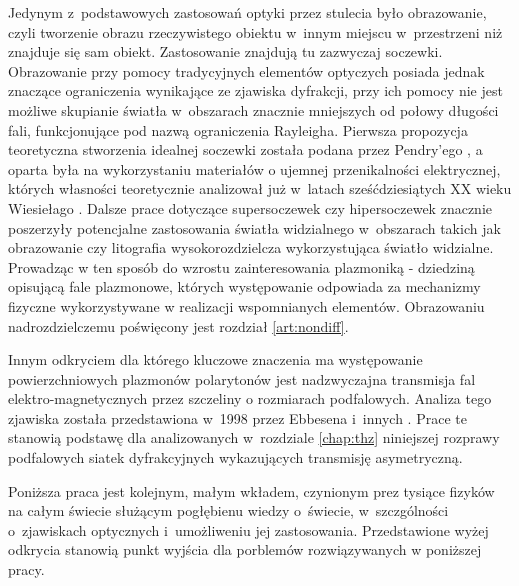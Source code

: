 
Jedynym z~podstawowych zastosowań optyki przez stulecia było obrazowanie, czyli tworzenie obrazu rzeczywistego obiektu w~innym miejscu w~przestrzeni niż znajduje się sam obiekt. Zastosowanie znajdują tu zazwyczaj soczewki. Obrazowanie przy pomocy tradycyjnych elementów optyczych posiada jednak znaczące ograniczenia wynikające ze zjawiska dyfrakcji, przy ich pomocy nie jest możliwe skupianie światła w~obszarach znacznie mniejszych od połowy długości fali, funkcjonujące pod nazwą ograniczenia Rayleigha. Pierwsza propozycja teoretyczna stworzenia idealnej soczewki została podana przez Pendry'ego \cite{PhysRevLett.85.3966}, a oparta była na wykorzystaniu materiałów o ujemnej przenikalności elektrycznej, których własności teoretycznie analizował już w~latach sześćdziesiątych XX wieku Wiesiełago \cite{veselago1968electrodynamics}. Dalsze prace dotyczące supersoczewek czy hipersoczewek \cite{liu2007far} znacznie poszerzyły potencjalne zastosowania światła widzialnego w~obszarach takich jak obrazowanie czy litografia wysokorozdzielcza wykorzystująca światło widzialne. Prowadząc w ten sposób do wzrostu zainteresowania plazmoniką - dziedziną opisującą fale plazmonowe, których występowanie odpowiada za mechanizmy fizyczne wykorzystywane w realizacji wspomnianych elementów. Obrazowaniu nadrozdzielczemu poświęcony jest rozdział \ref{art:nondiff}.

Innym odkryciem dla którego kluczowe znaczenia ma występowanie powierzchniowych plazmonów polarytonów jest nadzwyczajna transmisja fal elektro-magnetycznych przez szczeliny o rozmiarach podfalowych. Analiza tego zjawiska została przedstawiona w~1998 przez Ebbesena i~innych \cite{ebbesen1998extraordinary}. Prace te stanowią podstawę dla analizowanych w~rozdziale \ref{chap:thz} niniejszej rozprawy podfalowych siatek dyfrakcyjnych wykazujących transmisję asymetryczną.

Poniższa praca jest kolejnym, małym wkładem, czynionym prez tysiące fizyków na całym świecie służącym pogłębienu wiedzy o~świecie, w~szczgólności o~zjawiskach optycznych i~umożliweniu jej zastosowania. Przedstawione wyżej odkrycia stanowią punkt wyjścia dla porblemów rozwiązywanych w poniższej pracy.
